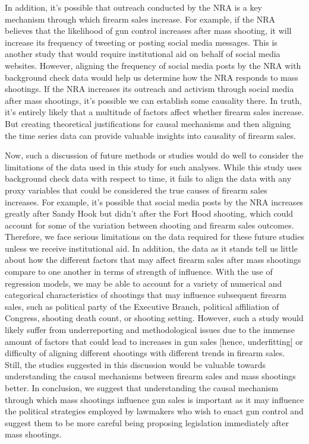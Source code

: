 \documentclass[9pt,twocolumn,twoside,lineno]{pnas-new}
\begin{document}
In addition, it's possible that outreach conducted by the NRA is a key mechanism through which firearm sales increase. For example, if the NRA believes that the likelihood of gun control increases after mass shooting, it will increase its frequency of tweeting or posting social media messages. This is another study that would require institutional aid on behalf of social media websites. However, aligning the frequency of social media posts by the NRA with background check data would help us determine how the NRA responds to mass shootings. If the NRA increases its outreach and activism through social media after mass shootings, it's possible we can establish some causality there. In truth, it's entirely likely that a multitude of factors affect whether firearm sales increase. But creating theoretical justifications for causal mechanisms and then aligning the time series data can provide valuable insights into causality of firearm sales. 

Now, such a discussion of future methods or studies would do well to consider the limitations of the data used in this study for such analyses. While this study uses background check data with respect to time, it fails to align the data with any proxy variables that could be considered the true causes of firearm sales increases. For example, it's possible that social media posts by the NRA increases greatly after Sandy Hook but didn't after the Fort Hood shooting, which could account for some of the variation between shooting and firearm sales outcomes. Therefore, we face serious limitations on the data required for these future studies unless we receive institutional aid. In addition, the data as it stands tell us little about how the different factors that may affect firearm sales after mass shootings compare to one another in terms of strength of influence. With the use of regression models, we may be able to account for a variety of numerical and categorical characteristics of shootings that may influence subsequent firearm sales, such as political party of the Executive Branch, political affiliation of Congress, shooting death count, or shooting setting. However, such a study would likely suffer from underreporting and methodological issues due to the immense amount of factors that could lead to increases in gun sales [hence, underfitting] or difficulty of aligning different shootings with different trends in firearm sales. Still, the studies suggested in this discussion would be valuable towards understanding the causal mechanisms between firearm sales and mass shootings better. In conclusion, we suggest that understanding the causal mechanism through which mass shootings influence gun sales is important as it may influence the political strategies employed by lawmakers who wish to enact gun control and suggest them to be more careful being proposing legislation immediately after mass shootings.


\showacknow{} %


\end{document}
